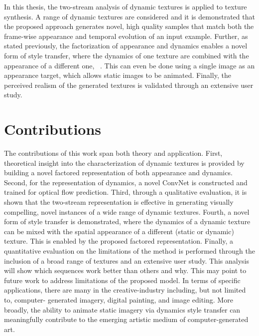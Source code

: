 In this thesis, the two-stream analysis of
dynamic textures is applied to texture synthesis.
A range of dynamic textures are considered and it is demonstrated that the 
proposed approach generates novel, high quality samples that match
both the frame-wise appearance and temporal evolution of an input
example.
Further, as stated previously, the factorization of appearance and dynamics enables a 
novel form of style transfer, where the dynamics of one texture are 
combined with the appearance of a different one,
\cf\ \cite{gatys2016image}.
This can even be done using a single image as an appearance
target, which allows static images to be animated.
Finally, the perceived realism of the generated textures is validated
through an extensive user study.

\section{Contributions}


The contributions of this work span both theory and application. First,
theoretical insight into the characterization of dynamic textures is provided by 
building a novel factored representation of both appearance and dynamics. Second, 
for the representation of dynamics, a novel ConvNet is constructed and trained for 
optical flow prediction. Third, through a qualitative evaluation, it is shown that the two-stream representation is 
effective in generating visually compelling, novel instances of a wide range of 
dynamic textures. Fourth, a novel form of style transfer is demonstrated, 
where the dynamics of a dynamic texture can be mixed with the spatial appearance 
of a different (static or dynamic) texture. This is enabled by the proposed factored 
representation. Finally, a quantitative evaluation on the limitations of the method is performed through 
the inclusion of a broad range of textures and an extensive user study. This analysis will show which 
sequences work better than others and why. This may point to future work to 
address limitations of the proposed model. In terms of specific applications, 
there are many in the creative-industry including, but not limited to, computer-
generated imagery, digital painting, and image editing. More broadly, the ability 
to animate static imagery via dynamics style transfer can meaningfully contribute 
to the emerging artistic medium of computer-generated art.